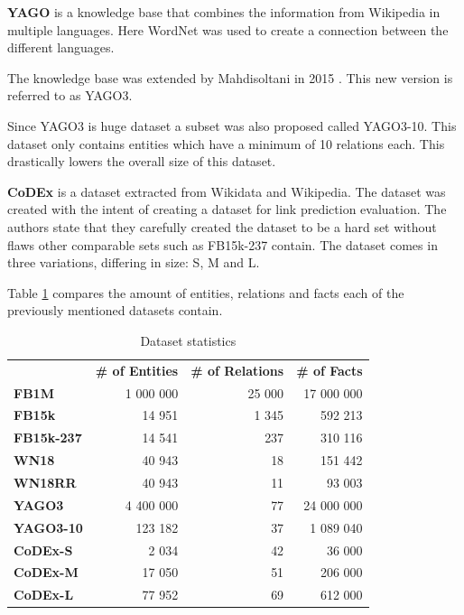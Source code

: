\textbf{YAGO} is a knowledge base that combines the information from Wikipedia in multiple languages. Here WordNet was used to create a connection between the different languages.  

The knowledge base was extended by Mahdisoltani in 2015 \cite{mahdisoltani_yago3_2015}. This new version is referred to as YAGO3. 

Since YAGO3 is huge dataset a subset was also proposed called YAGO3-10. This dataset only contains entities which have a minimum of 10 relations each. This drastically lowers the overall size of this dataset. \hfill \break

\textbf{CoDEx} \cite{safavi_codex_2020} is a dataset extracted from Wikidata and Wikipedia. The dataset was created with the intent of creating a dataset for link prediction evaluation. The authors state that they carefully created the dataset to be a hard set without flaws other comparable sets such as FB15k-237 contain. The dataset comes in three variations, differing in size: S, M and L. \hfill \break

Table \ref{tab:dataset_stats} compares the amount of entities, relations and facts each of the previously mentioned datasets contain.

\begin{table}[H]
\centering
\begin{tabular}{lrrr}
 & \multicolumn{1}{l}{\textbf{\# of Entities}} & \multicolumn{1}{l}{\textbf{\# of Relations}} & \multicolumn{1}{l}{\textbf{\# of Facts}} \\
\textbf{FB1M} & 1 000 000 & 25 000 & 17 000 000 \\
\textbf{FB15k} & 14 951 & 1 345 & 592 213 \\
\textbf{FB15k-237} & 14 541 & 237 & 310 116 \\
\textbf{WN18} & 40 943 & 18 & 151 442 \\
\textbf{WN18RR} & 40 943 & 11 & 93 003 \\
\textbf{YAGO3} & 4 400 000 & 77 & 24 000 000 \\
\textbf{YAGO3-10} & 123 182 & 37 & 1 089 040 \\
\textbf{CoDEx-S} & 2 034 & 42 & 36 000 \\
\textbf{CoDEx-M} & 17 050 & 51 & 206 000 \\
\textbf{CoDEx-L} & 77 952 & 69 & 612 000
\end{tabular}
\caption{Dataset statistics}
\label{tab:dataset_stats}
\end{table}